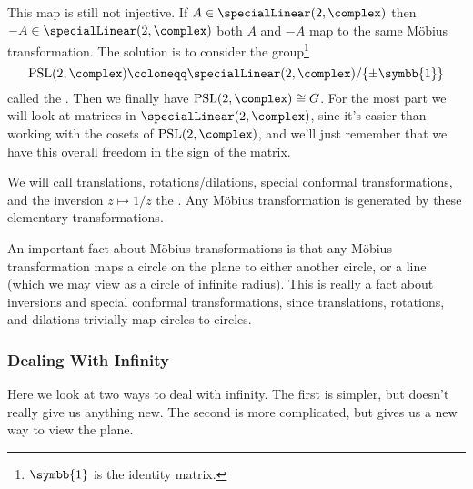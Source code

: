 \documentclass[fleqn]{NotesClass}
\newcommand{\isomorphic}{\cong}
\DeclareMathOperator{\projectiveSpecialLinear}{PSL}
\newcommand{\identityMatrix}{\symbb{1}}
\begin{document}
    This map is still not injective.
    If \(A \in \specialLinear(2, \complex)\) then \(-A \in \specialLinear(2, \complex)\) both \(A\) and \(-A\) map to the same M\"obius transformation.
    The solution is to consider the group\footnote{\(\identityMatrix\) is the identity matrix.}
    \begin{equation}
        \projectiveSpecialLinear(2, \complex) \coloneqq \specialLinear(2, \complex) / \{\pm \identityMatrix\}
    \end{equation}
    called the .
    Then we finally have \(\projectiveSpecialLinear(2, \complex) \isomorphic G\).
    For the most part we will look at matrices in \(\specialLinear(2, \complex)\), sine it's easier than working with the cosets of \(\projectiveSpecialLinear(2, \complex)\), and we'll just remember that we have this overall freedom in the sign of the matrix.
    
    We will call translations, rotations/dilations, special conformal transformations, and the inversion \(z \mapsto 1/z\) the .
    Any M\"obius transformation is generated by these elementary transformations.
    
    An important fact about M\"obius transformations is that any M\"obius transformation maps a circle on the plane to either another circle, or a line (which we may view as a circle of infinite radius).
    This is really a fact about inversions and special conformal transformations, since translations, rotations, and dilations trivially map circles to circles.
    
    \subsubsection{Dealing With Infinity}
    Here we look at two ways to deal with infinity.
    The first is simpler, but doesn't really give us anything new.
    The second is more complicated, but gives us a new way to view the plane.
    
\end{document}
